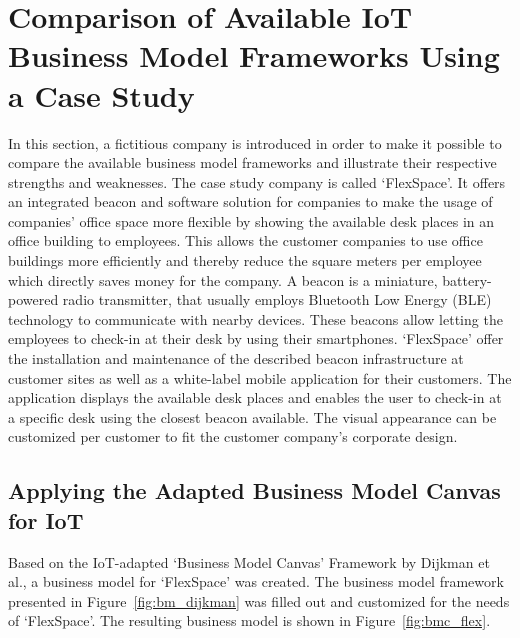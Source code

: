 \section{Comparison of Available IoT Business Model Frameworks Using a Case Study}
\label{sec:bmf_comparison}
\vspace{-1em}
	In this section, a fictitious company is introduced in order to make it possible to compare the available business model frameworks and illustrate their respective strengths and weaknesses.
	The case study company is called `FlexSpace'. It offers an integrated beacon and software solution for companies to make the usage of companies' office space more flexible by showing the available desk places in an office building to employees. This allows the customer companies to use office buildings more efficiently and thereby reduce the square meters per employee which directly saves money for the company. A beacon is a miniature, battery-powered radio transmitter, that usually employs  Bluetooth Low Energy (BLE) technology to communicate with nearby devices. These beacons allow letting the employees to check-in at their desk by using their smartphones. `FlexSpace' offer the installation and maintenance of the described beacon infrastructure at customer sites as well as a white-label mobile application for their customers. The application displays the available desk places and enables the user to check-in at a specific desk using the closest beacon available. The visual appearance can be customized per customer to fit the customer company's corporate design.
	\vspace{-1em}
	\subsection{Applying the Adapted Business Model Canvas for IoT}
	\vspace{-1em}
		Based on the IoT-adapted `Business Model Canvas' Framework by Dijkman et al., a business model for `FlexSpace' was created. The business model framework presented in Figure~\ref{fig:bm_dijkman} was filled out and customized for the needs of `FlexSpace'. The resulting business model is shown in Figure~\ref{fig:bmc_flex}.

